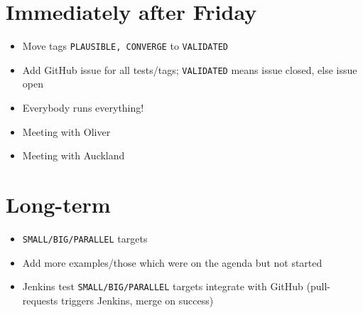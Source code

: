 \section{Immediately after Friday}

\begin{itemize}
	\item Move tags \texttt{PLAUSIBLE, CONVERGE} to \texttt{VALIDATED}
	\item Add GitHub issue for all tests/tags; \texttt{VALIDATED} means issue closed, else issue open
	\item Everybody runs everything!
	\item Meeting with Oliver
	\item Meeting with Auckland
\end{itemize}
	
\section{Long-term}
\begin{itemize}
	\item \texttt{SMALL/BIG/PARALLEL} targets
	\item Add more examples/those which were on the agenda but not started
	\item Jenkins
	\subitem test \texttt{SMALL/BIG/PARALLEL} targets
	\subitem integrate with GitHub (pull-requests triggers Jenkins, merge on success)
\end{itemize}


